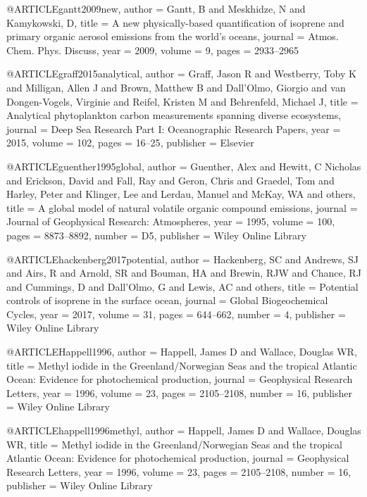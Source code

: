 @ARTICLE{gantt2009new,
  author = {Gantt, B and Meskhidze, N and Kamykowski, D},
  title = {A new physically-based quantification of isoprene and primary organic
	aerosol emissions from the world's oceans},
  journal = {Atmos. Chem. Phys. Discuss},
  year = {2009},
  volume = {9},
  pages = {2933--2965}
}

@ARTICLE{graff2015analytical,
  author = {Graff, Jason R and Westberry, Toby K and Milligan, Allen J and Brown,
	Matthew B and Dall’Olmo, Giorgio and van Dongen-Vogels, Virginie
	and Reifel, Kristen M and Behrenfeld, Michael J},
  title = {Analytical phytoplankton carbon measurements spanning diverse ecosystems},
  journal = {Deep Sea Research Part I: Oceanographic Research Papers},
  year = {2015},
  volume = {102},
  pages = {16--25},
  publisher = {Elsevier}
}

@ARTICLE{guenther1995global,
  author = {Guenther, Alex and Hewitt, C Nicholas and Erickson, David and Fall,
	Ray and Geron, Chris and Graedel, Tom and Harley, Peter and Klinger,
	Lee and Lerdau, Manuel and McKay, WA and others},
  title = {A global model of natural volatile organic compound emissions},
  journal = {Journal of Geophysical Research: Atmospheres},
  year = {1995},
  volume = {100},
  pages = {8873--8892},
  number = {D5},
  publisher = {Wiley Online Library}
}

@ARTICLE{hackenberg2017potential,
  author = {Hackenberg, SC and Andrews, SJ and Airs, R and Arnold, SR and Bouman,
	HA and Brewin, RJW and Chance, RJ and Cummings, D and Dall'Olmo,
	G and Lewis, AC and others},
  title = {Potential controls of isoprene in the surface ocean},
  journal = {Global Biogeochemical Cycles},
  year = {2017},
  volume = {31},
  pages = {644--662},
  number = {4},
  publisher = {Wiley Online Library}
}

@ARTICLE{Happell1996,
  author = {Happell, James D and Wallace, Douglas WR},
  title = {Methyl iodide in the Greenland/Norwegian Seas and the tropical Atlantic
	Ocean: Evidence for photochemical production},
  journal = {Geophysical Research Letters},
  year = {1996},
  volume = {23},
  pages = {2105--2108},
  number = {16},
  publisher = {Wiley Online Library}
}

@ARTICLE{happell1996methyl,
  author = {Happell, James D and Wallace, Douglas WR},
  title = {Methyl iodide in the Greenland/Norwegian Seas and the tropical Atlantic
	Ocean: Evidence for photochemical production},
  journal = {Geophysical Research Letters},
  year = {1996},
  volume = {23},
  pages = {2105--2108},
  number = {16},
  publisher = {Wiley Online Library}
}

